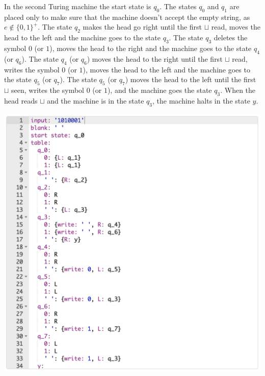 \documentclass[a4paper]{article}
\begin{document}
In the second Turing machine the start state is $q_0$.
The states $q_0$ and $q_1$ are placed only to make sure that the machine doesn't accept the empty string, as $e \notin \{0,1\}^+$.
The state $q_2$ makes the head go right until the first $\sqcup$ read, moves the head to the left and the machine goes to the state $q_3$.
The state $q_3$ deletes the symbol $0$ (or $1$), moves the head to the right and the machine goes to the state $q_4$ (or $q_6$).
The state $q_4$ (or $q_6$) moves the head to the right until the first $\sqcup$ read, writes the symbol $0$ (or $1$), moves the head to the left and the machine goes to the state $q_5$ (or $q_7$).
The state $q_5$ (or $q_7$) moves the head to the left until the first $\sqcup$ seen, writes the symbol $0$ (or $1$), and the machine goes the state $q_3$.
When the head reads $\sqcup$ and the machine is in the state $q_3$, the machine halts in the state $y$.

\includegraphics[width=\textwidth]{TM2.2}

\newpage
\end{document}
